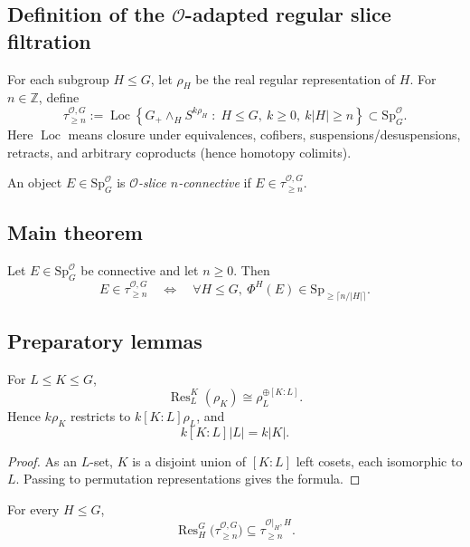 \subsection*{Definition of the $\mathcal O$-adapted regular slice filtration}

For each subgroup $H\le G$, let $\rho_H$ be the real regular representation of $H$.
For $n\in\mathbb Z$, define
\[
\tau^{\mathcal O,G}_{\ge n}
:=
\operatorname{Loc}
\left\{
G_+\wedge_H S^{k\rho_H}
\;:\;
H\le G,\ k\ge 0,\ k|H|\ge n
\right\}
\subset \mathrm{Sp}^{\mathcal O}_G.
\]
Here $\operatorname{Loc}$ means closure under equivalences, cofibers, suspensions/desuspensions, retracts, and arbitrary coproducts (hence homotopy colimits).

An object $E\in\mathrm{Sp}^{\mathcal O}_G$ is \emph{$\mathcal O$-slice $n$-connective} if $E\in\tau^{\mathcal O,G}_{\ge n}$.

\subsection*{Main theorem}

\begin{theorem}\label{thm:q5-main}
Let $E\in\mathrm{Sp}^{\mathcal O}_G$ be connective and let $n\ge 0$. Then
\[
E\in\tau^{\mathcal O,G}_{\ge n}
\quad\Longleftrightarrow\quad
\forall H\le G,\ \Phi^H(E)\in\mathrm{Sp}_{\ge \lceil n/|H|\rceil}.
\]
\end{theorem}

\subsection*{Preparatory lemmas}

\begin{lemma}\label{lem:q5-rho-restrict}
For $L\le K\le G$,
\[
\operatorname{Res}^K_L(\rho_K)\cong \rho_L^{\oplus [K:L]}.
\]
Hence $k\rho_K$ restricts to $k[K:L]\rho_L$, and
\[
k[K:L]|L|=k|K|.
\]
\end{lemma}

\begin{proof}
As an $L$-set, $K$ is a disjoint union of $[K:L]$ left cosets, each isomorphic to $L$. Passing to permutation representations gives the formula.
\end{proof}

\begin{lemma}\label{lem:q5-res-preserve}
For every $H\le G$,
\[
\operatorname{Res}^G_H\bigl(\tau^{\mathcal O,G}_{\ge n}\bigr)\subseteq \tau^{\mathcal O|_H,H}_{\ge n}.
\]
\end{lemma}

